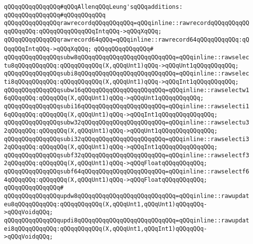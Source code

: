 \newline
\verb|qQQqqQQqqQQqqQQq#qQQqAllenqQQqLeung'sqQQqadditions:|\newline
\verb|qQQqqQQqqQQqqQQq#qQQqqQQqqQQq|\newline
\verb|qQQqqQQqqQQqqQQqrawrecordqQQqqQQqqQQq=qQQqinline::rawrecordqQQqqQQqqQQqqQQqqQQq:qQQqqQQqqQQqqQQqIntqQQq->qQQqXqQQq;|\newline
\verb|qQQqqQQqqQQqqQQqrawrecord64qQQq=qQQqinline::rawrecord64qQQqqQQqqQQq:qQQqqQQqIntqQQq->qQQqXqQQq;|\newline
\verb|qQQqqQQqqQQqqQQq#|\newline
\verb|qQQqqQQqqQQqqQQqsubw8qQQqqQQqqQQqqQQqqQQqqQQqqQQq=qQQqinline::rawselectu8qQQqqQQqqQQq:qQQqqQQqqQQq(X,qQQqUnt1)qQQq->qQQqUnt1qQQqqQQqqQQq;|\newline
\verb|qQQqqQQqqQQqqQQqsubi8qQQqqQQqqQQqqQQqqQQqqQQqqQQq=qQQqinline::rawselecti8qQQqqQQqqQQq:qQQqqQQqqQQq(X,qQQqUnt1)qQQq->qQQqInt1qQQqqQQqqQQq;|\newline
\verb|qQQqqQQqqQQqqQQqsubw16qQQqqQQqqQQqqQQqqQQqqQQq=qQQqinline::rawselectw16qQQqqQQq:qQQqqQQq(X,qQQqUnt1)qQQq->qQQqUnt1qQQqqQQqqQQq;|\newline
\verb|qQQqqQQqqQQqqQQqsubi16qQQqqQQqqQQqqQQqqQQqqQQq=qQQqinline::rawselecti16qQQqqQQq:qQQqqQQq(X,qQQqUnt1)qQQq->qQQqInt1qQQqqQQqqQQqqQQq;|\newline
\verb|qQQqqQQqqQQqqQQqsubw32qQQqqQQqqQQqqQQqqQQqqQQq=qQQqinline::rawselectu32qQQqqQQq:qQQqqQQq(X,qQQqUnt1)qQQq->qQQqUnt1qQQqqQQqqQQqqQQq;|\newline
\verb|qQQqqQQqqQQqqQQqsubi32qQQqqQQqqQQqqQQqqQQqqQQq=qQQqinline::rawselecti32qQQqqQQq:qQQqqQQq(X,qQQqUnt1)qQQq->qQQqInt1qQQqqQQqqQQqqQQq;|\newline
\verb|qQQqqQQqqQQqqQQqsubf32qQQqqQQqqQQqqQQqqQQqqQQq=qQQqinline::rawselectf32qQQqqQQq:qQQqqQQq(X,qQQqUnt1)qQQq->qQQqFloatqQQqqQQqqQQq;|\newline
\verb|qQQqqQQqqQQqqQQqsubf64qQQqqQQqqQQqqQQqqQQqqQQq=qQQqinline::rawselectf64qQQqqQQq:qQQqqQQq(X,qQQqUnt1)qQQq->qQQqFloatqQQqqQQqqQQq;|\newline
\verb|qQQqqQQqqQQqqQQq#|\newline
\verb|qQQqqQQqqQQqqQQqupdw8qQQqqQQqqQQqqQQqqQQqqQQqqQQq=qQQqinline::rawupdateu8qQQqqQQqqQQq:qQQqqQQqqQQq(X,qQQqUnt1,qQQqUnt1)qQQqqQQq->qQQqVoidqQQq;|\newline
\verb|qQQqqQQqqQQqqQQqupdi8qQQqqQQqqQQqqQQqqQQqqQQqqQQq=qQQqinline::rawupdatei8qQQqqQQqqQQq:qQQqqQQqqQQq(X,qQQqUnt1,qQQqInt1)qQQqqQQq->qQQqVoidqQQq;|\newline
